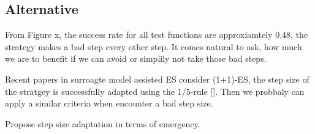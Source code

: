 








\subsection{Alternative}

From Figure x, the success rate for all test functions are approxiamtely 0.48, the strategy makes a bad step every other step. It comes natural to ask, how much we are to benefit if we can avoid or simplily not take those bad steps.  


Recent papers in surroagte model assisted ES consider (1+1)-ES, the step size of the stratgey is successfully adapted using the 1/5-rule []. Then we probbaly can apply a similar criteria when encounter a bad step size. 

Propose step size adaptation in terms of emergency.

